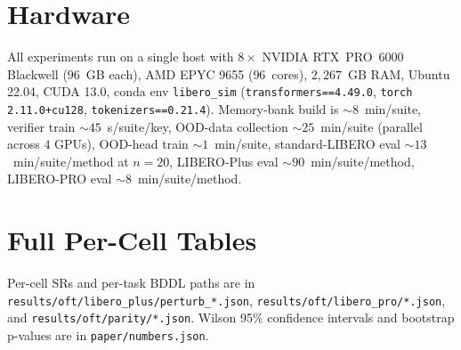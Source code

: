 \documentclass{article}
\begin{document}
\section{Hardware}
\label{appendix:hardware}

All experiments run on a single host with $8\times$ NVIDIA RTX~PRO~6000
Blackwell ($96$~GB each), AMD EPYC 9655 ($96$~cores), $2{,}267$~GB RAM,
Ubuntu 22.04, CUDA 13.0, conda env \texttt{libero\_sim}
(\texttt{transformers==4.49.0}, \texttt{torch 2.11.0+cu128},
\texttt{tokenizers==0.21.4}). Memory-bank build is $\sim\!8$~min/suite,
verifier train $\sim\!45$~s/suite/key, OOD-data collection
$\sim\!25$~min/suite (parallel across $4$ GPUs), OOD-head train
$\sim\!1$~min/suite, standard-LIBERO eval $\sim\!13$~min/suite/method
at $n{=}20$, LIBERO-Plus eval $\sim\!90$~min/suite/method,
LIBERO-PRO eval $\sim\!8$~min/suite/method.

\section{Full Per-Cell Tables}
\label{appendix:fulltables}

Per-cell SRs and per-task BDDL paths are in
\texttt{results/oft/libero\_plus/perturb\_*.json},
\texttt{results/oft/libero\_pro/*.json}, and
\texttt{results/oft/parity/*.json}. Wilson 95\% confidence intervals
and bootstrap p-values are in \texttt{paper/numbers.json}.
\end{document}
